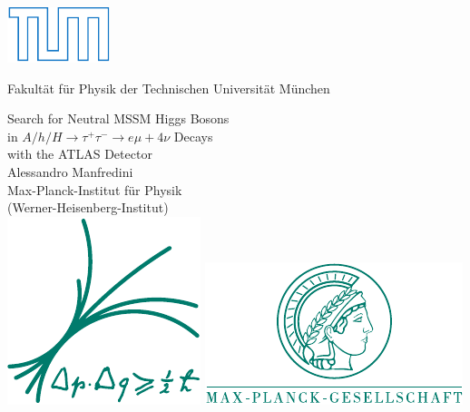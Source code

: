 \thispagestyle{empty}
  \begin{center}
        \includegraphics[height=2.cm]{logos/TUMLogo_oZ_Outline_blau_CMYK.pdf}      

	\vspace*{2ex}

        \Large Fakult\"at f\"ur Physik der Technischen Universit\"at M\"unchen \\       
        \vspace*{14ex}


        {\LARGE Search for Neutral MSSM Higgs Bosons \\in $A/h/H \rightarrow \tau^+ \tau^- \rightarrow e\mu + 4\nu$ Decays\\with the ATLAS Detector}\\[5ex] 

  	\Large Alessandro Manfredini\\[14ex]

        \Large Max-Planck-Institut f\"{u}r Physik \\       
        \Large (Werner-Heisenberg-Institut) \\[5ex]

        \includegraphics[height=3.cm]{MPP_os_logo_cmyk.pdf}     \hspace{4cm} 
        \includegraphics[height=3.cm]{MPG_logo_cmyk.pdf}      
  \end{center}


\restoregeometry
\clearemptydoublepage

